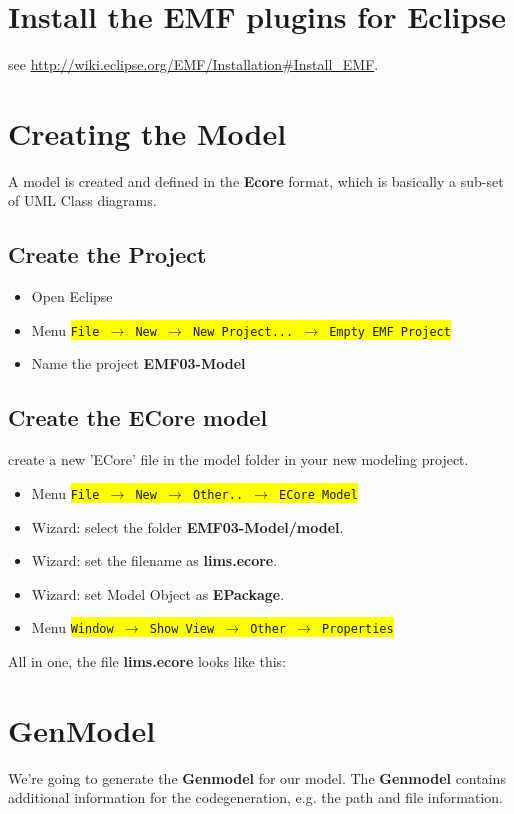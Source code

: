 \documentclass{article}
\newcommand{\menu}[1]{\colorbox{yellow}{\texttt{#1}}}
\begin{document}
\section{Install the EMF plugins for Eclipse}

see \url{http://wiki.eclipse.org/EMF/Installation#Install_EMF}.

\section{Creating the Model}
A model is created and defined in the \textbf{Ecore} format, which is basically a sub-set of UML Class diagrams.\\
\subsection{Create the Project}
\begin{itemize}
\item Open Eclipse
\item Menu \menu{File $\rightarrow$  New  $\rightarrow$ New Project... $\rightarrow$ Empty EMF Project}
\item Name the project \textbf{EMF03-Model}
\end{itemize}
\subsection{Create the ECore model}
create a new 'ECore' file in the model folder in your new modeling project.
\begin{itemize}
\item Menu \menu{File $\rightarrow$  New  $\rightarrow$ Other.. $\rightarrow$ ECore Model}
\item Wizard: select the folder \textbf{EMF03-Model/model}.
\item Wizard: set the filename as \textbf{lims.ecore}.
\item Wizard: set Model Object as  \textbf{EPackage}.
\item Menu \menu{Window  $\rightarrow$ Show View $\rightarrow$ Other $\rightarrow$ Properties}
\end{itemize}


All in one, the file \textbf{lims.ecore} looks like this:


\section{GenModel}
We're going to generate the \textbf{Genmodel} for our model. The \textbf{Genmodel} contains additional information for the codegeneration, e.g. the path and file information. 
\end{document}
